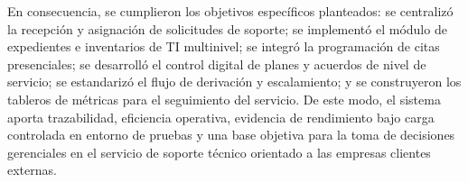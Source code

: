 En consecuencia, se cumplieron los objetivos específicos planteados: se centralizó la recepción y asignación de solicitudes de soporte; se implementó el módulo de expedientes e inventarios de TI multinivel; se integró la programación de citas presenciales; se desarrolló el control digital de planes y acuerdos de nivel de servicio; se estandarizó el flujo de derivación y escalamiento; y se construyeron los tableros de métricas para el seguimiento del servicio. De este modo, el sistema aporta trazabilidad, eficiencia operativa, evidencia de rendimiento bajo carga controlada en entorno de pruebas y una base objetiva para la toma de decisiones gerenciales en el servicio de soporte técnico orientado a las empresas clientes externas.